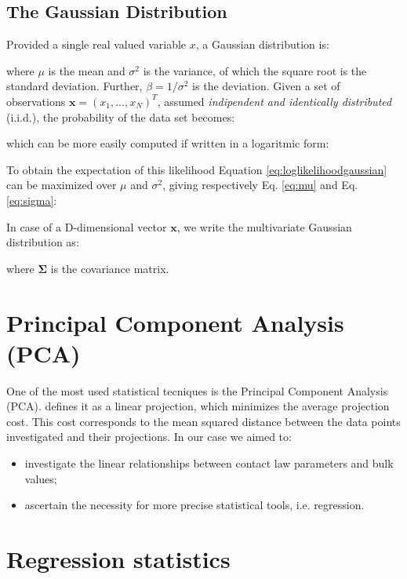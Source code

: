 \subsection{The Gaussian Distribution}
\label{subsec:gaussian}

Provided a single real valued variable $x$, a Gaussian distribution is:

where $\mu$ is the mean and $\sigma^2$ is the variance, of which the square root
is the standard deviation.
Further, $\beta = 1/\sigma^2$ is the deviation.
Given a set of observations $\mathbf{x} = (x_1, \ldots, x_N)^T$, assumed
\textit{indipendent and identically distributed} (i.i.d.), the probability of
the data set becomes:

which can be more easily computed if written in a logaritmic form:

To obtain the expectation of this likelihood Equation
\ref{eq:loglikelihoodgaussian} can be maximized over $\mu$ and $\sigma^2$,
giving respectively Eq. \ref{eq:mu} and Eq. \ref{eq:sigma}:


In case of a D-dimensional vector $\mathbf{x}$, we write the multivariate
Gaussian distribution as:

where $\mathbf{\Sigma}$ is the covariance matrix.

\section{Principal Component Analysis (PCA)}
\label{sec:pca}

One of the most used statistical tecniques is the Principal Component Analysis
(PCA).
\citet{RefWorks:194} defines it as a linear projection, which minimizes the
average projection cost.
This cost corresponds to the mean squared distance between the data
points investigated and their projections.
In our case we aimed to:
\begin{itemize}
  \item{investigate the linear relationships between contact law parameters and
  bulk values;}
  \item{ascertain the necessity for more precise statistical tools, i.e.
  regression.}
\end{itemize}

\section{Regression statistics}
\label{sec:regressionstatistics}


